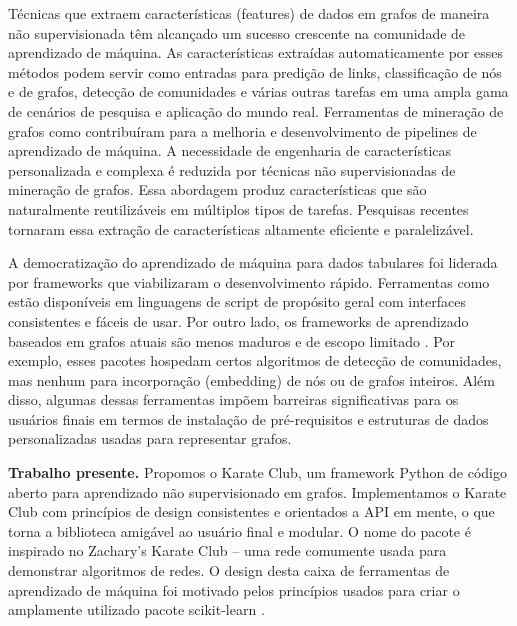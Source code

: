 \documentclass[sigconf]{acmart}
\begin{document}
Técnicas que extraem características (features) de dados em grafos de maneira não supervisionada \cite{DeepWalk, Graph2Vec, DANMF} têm alcançado um sucesso crescente na comunidade de aprendizado de máquina. As características extraídas automaticamente por esses métodos podem servir como entradas para predição de links, classificação de nós e de grafos, detecção de comunidades e várias outras tarefas \cite{DeepWalk, Walklets, MUSAE, graph_classification_baseline} em uma ampla gama de cenários de pesquisa e aplicação do mundo real. Ferramentas de mineração de grafos como \cite{NetworkX, SNAP, GraphTool} contribuíram para a melhoria e desenvolvimento de pipelines de aprendizado de máquina. A necessidade de engenharia de características personalizada e complexa é reduzida por técnicas não supervisionadas de mineração de grafos. Essa abordagem produz características que são naturalmente reutilizáveis em múltiplos tipos de tarefas. Pesquisas recentes \cite{DeepWalk, Walklets, NetLSD} tornaram essa extração de características altamente eficiente e paralelizável.

A democratização do aprendizado de máquina para dados tabulares foi liderada por frameworks que viabilizaram o desenvolvimento rápido. Ferramentas como \cite{TensorFlow, ScikitLearn, PyTorch} estão disponíveis em linguagens de script de propósito geral com interfaces consistentes e fáceis de usar. Por outro lado, os frameworks de aprendizado baseados em grafos atuais são menos maduros e de escopo limitado \cite{NetworkX, GraphTool}. Por exemplo, esses pacotes hospedam certos algoritmos de detecção de comunidades, mas nenhum para incorporação (embedding) de nós ou de grafos inteiros. Além disso, algumas dessas ferramentas \cite{SNAP, GraphTool} impõem barreiras significativas para os usuários finais em termos de instalação de pré-requisitos e estruturas de dados personalizadas usadas para representar grafos.

\textbf{Trabalho presente.} Propomos o Karate Club, um framework Python de código aberto para aprendizado não supervisionado em grafos. Implementamos o Karate Club com princípios de design consistentes e orientados a API em mente, o que torna a biblioteca amigável ao usuário final e modular. O nome do pacote é inspirado no Zachary’s Karate Club \cite{Zachary1977} -- uma rede comumente usada para demonstrar algoritmos de redes. O design desta caixa de ferramentas de aprendizado de máquina foi motivado pelos princípios usados para criar o amplamente utilizado pacote scikit-learn \cite{ScikitLearn}.
\end{document}
